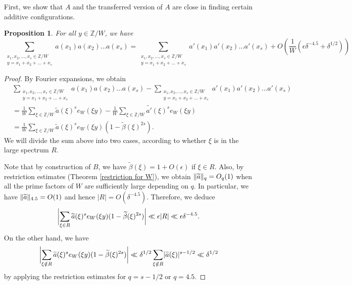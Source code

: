 \documentclass[11pt]{amsart}
\theoremstyle{plain} %
\newtheorem{prop}[thm]{Proposition}
\theoremstyle{remark}
\numberwithin{equation}{section}
\newcommand{\Z}{\mathbb{Z}}
\DeclarePairedDelimiter\abs{\lvert}{\rvert}
\DeclarePairedDelimiter\norm{\lVert}{\rVert}
\begin{document}
First, we show that $A$ and the transferred version of $A$ are close in finding certain additive configurations. 

\begin{prop}\label{close in counting}
    For all $y\in \Z/W$, we have
    \begin{equation*}
        \sum_{\substack{x_1,x_2,...,x_s\in\Z/W\\y=x_1+x_2+...+x_s}}a(x_1)a(x_2)...a(x_s)=\sum_{\substack{x_1,x_2,...,x_s\in\Z/W\\y=x_1+x_2+...+x_s}}a'(x_1)a'(x_2)...a'(x_s)+O\left(\frac{1}{W}(\epsilon \delta^{-4.5}+\delta^{1/2})\right)
    \end{equation*}
\end{prop}

\begin{proof}
    By Fourier expansions, we obtain
    \begin{equation*}
        \begin{split}
            &\sum_{\substack{x_1,x_2,...,x_s\in\Z/W\\y=x_1+x_2+...+x_s}}a(x_1)a(x_2)...a(x_s)-\sum_{\substack{x_1,x_2,...,x_s\in\Z/W\\y=x_1+x_2+...+x_s}}a'(x_1)a'(x_2)...a'(x_s)\\
            &=\frac{1}{W}\sum_{\xi\in\Z/W}\widetilde{a}(\xi)^se_W(\xi y)-\frac{1}{W}\sum_{\xi\in\Z/W}\widetilde{a'}(\xi)^se_W(\xi y)\\
            &=\frac{1}{W}\sum_{\xi\in\Z/W}\widetilde{a}(\xi)^se_W(\xi y)(1-\widetilde{\beta}(\xi)^{2s}).
        \end{split}
    \end{equation*}
    We will divide the sum above into two cases, according to whether $\xi$ is in the large spectrum $R$.

    Note that by construction of $B$, we have $\widetilde{\beta}(\xi)=1+O(\epsilon)$ if $\xi\in R$. Also, by restriction estimates (Theorem \ref{restriction for W}), we obtain $\norm{\widetilde{a}}_q=O_q(1)$ when all the prime factors of $W$ are sufficiently large depending on $q$. In particular, we have $\norm{\widetilde{a}}_{4.5}=O(1)$ and hence $|R|=O(\delta^{-4.5})$. Therefore, we deduce
    \begin{equation*}
        \abs[\bigg]{\sum_{\xi\in R}\widetilde{a}(\xi)^se_W(\xi y)(1-\widetilde{\beta}(\xi)^{2s})}\ll \epsilon|R|\ll \epsilon \delta^{-4.5}.
    \end{equation*}
    On the other hand, we have
    \begin{equation*}
        \abs[\bigg]{\sum_{\xi\notin R}\widetilde{a}(\xi)^se_W(\xi y)(1-\widetilde{\beta}(\xi)^{2s})}\ll \delta^{1/2}\sum_{\xi\notin R}\abs{\widetilde{a}(\xi)}^{s-1/2}\ll \delta^{1/2}
    \end{equation*}
    by applying the restriction estimates for $q=s-1/2$ or $q=4.5$.
\end{proof}
\end{document}
